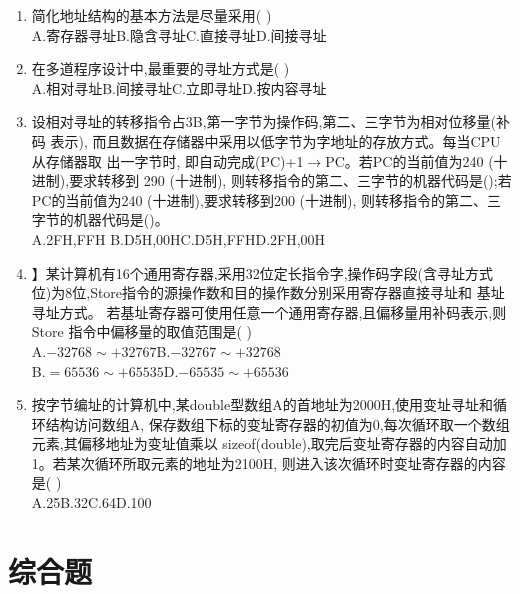 \documentclass[12pt, a4paper, oneside, UTF8]{ctexbook}
\begin{document}
\begin{enumerate}
    \item 简化地址结构的基本方法是尽量采用(   ) \\
    A.寄存器寻址\qquad B.隐含寻址\qquad C.直接寻址\qquad D.间接寻址 

    \item 在多道程序设计中,最重要的寻址方式是(   ) \\
    A.相对寻址\qquad B.间接寻址\qquad C.立即寻址\qquad D.按内容寻址
    
    \item 设相对寻址的转移指令占3B,第一字节为操作码,第二、三字节为相对位移量(补码 表示),
    而且数据在存储器中采用以低字节为字地址的存放方式。每当CPU从存储器取 出一字节时,
    即自动完成(PC)+1$\rightarrow$PC。若PC的当前值为240 (十进制),要求转移到 290 (十进制),
    则转移指令的第二、三字节的机器代码是();若PC的当前值为240 (十进制),要求转移到200 (十进制),
    则转移指令的第二、三字节的机器代码是()。 \\
    A.2FH,FFH \qquad B.D5H,00H\qquad C.D5H,FFH\qquad D.2FH,00H

    \item 】某计算机有16个通用寄存器,采用32位定长指令字,操作码字段(含寻址方式位)为8位,Store指令的源操作数和目的操作数分别采用寄存器直接寻址和 基址寻址方式。
    若基址寄存器可使用任意一个通用寄存器,且偏移量用补码表示,则Store 指令中偏移量的取值范围是(   ) \\
    A.$-32768\sim +32767$\qquad B.$-32767\sim +32768$ \\
    B.$=65536\sim +65535$\qquad D.$-65535\sim +65536$ 

    \item 按字节编址的计算机中,某double型数组A的首地址为2000H,使用变址寻址和循环结构访问数组A,
    保存数组下标的变址寄存器的初值为0,每次循环取一个数组元素,其偏移地址为变址值乘以
    sizeof(double),取完后变址寄存器的内容自动加1。若某次循环所取元素的地址为2100H,
    则进入该次循环时变址寄存器的内容是(   ) \\
    A.25\qquad B.32\qquad C.64\qquad D.100 

\end{enumerate}

\section{综合题}
\ifx\allfiles\undefined
\end{document}
